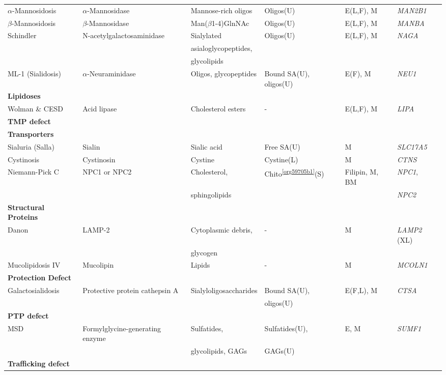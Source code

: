 \documentclass[landscape]{article}
\begin{document}
\begin{longtable}{llllll}
\(\alpha\)-Mannosidosis & \(\alpha\)-Mannosidase & Mannose-rich oligos & Oligos(U) & E(L,F), M & \emph{MAN2B1}\\
\(\beta\)-Mannosidosis & \(\beta\)-Mannosidase & Man(\(\beta\)1-4)GlnNAc & Oligos(U) & E(L,F), M & \emph{MANBA}\\
Schindler & N-acetylgalactosaminidase & Sialylated & Oligos(U) & E(L,F), M & \emph{NAGA}\\
 &  & asialoglycopeptides, &  &  & \\
 &  & glycolipids &  &  & \\
ML-1 (Sialidosis) & \(\alpha\)-Neuraminidase & Oligos, glycopeptides & Bound SA(U), oligos(U) & E(F), M & \emph{NEU1}\\
\hline
\textbf{Lipidoses} &  &  &  &  & \\
Wolman \& CESD & Acid lipase & Cholesterol esters & - & E(L,F), M & \emph{LIPA}\\
\hline
\textbf{TMP defect} &  &  &  &  & \\
\textbf{Transporters} &  &  &  &  & \\
Sialuria (Salla) & Sialin & Sialic acid & Free SA(U) & M & \emph{SLC17A5}\\
Cystinosis & Cystinosin & Cystine & Cystine(L) & M & \emph{CTNS}\\
Niemann-Pick C & NPC1 or NPC2 & Cholesterol, & Chito\textsuperscript{\ref{org59705b1}}(S) & Filipin, M, BM & \emph{NPC1},\\
 &  & sphingolipids &  &  & \emph{NPC2}\\
\textbf{Structural Proteins} &  &  &  &  & \\
Danon & LAMP-2 & Cytoplasmic debris, & - & M & \emph{LAMP2} (XL)\\
 &  & glycogen &  &  & \\
Mucolipidosis IV & Mucolipin & Lipids & - & M & \emph{MCOLN1}\\
\hline
\textbf{Protection Defect} &  &  &  &  & \\
Galactosialidosis & Protective protein cathepsin A & Sialyloligosaccharides & Bound SA(U), & E(F,L)\footnotemark, M & \emph{CTSA}\\
 &  &  & oligos(U) &  & \\
\hline
\textbf{PTP defect} &  &  &  &  & \\
MSD & Formylglycine-generating enzyme & Sulfatides, & Sulfatides(U), & E\footnotemark, M & \emph{SUMF1}\\
 &  & glycolipids, GAGs & GAGs(U) &  & \\
\hline
\textbf{Trafficking defect} &  &  &  &  & \\

\end{longtable}
\end{document}
